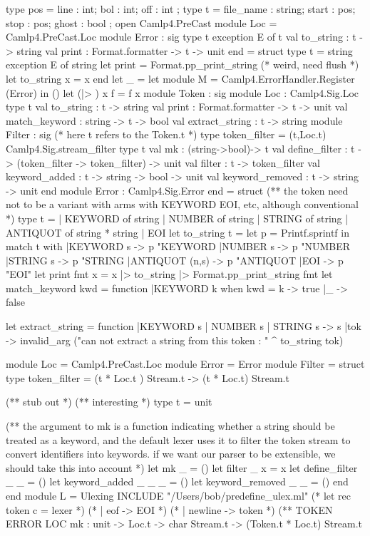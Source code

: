 \begin{enumerate}
\begin{bluecode}
type pos = {
  line : int;
  bol  : int;
  off  : int
};
type t = {
  file_name : string;
  start     : pos;
  stop      : pos;
  ghost     : bool
};
open Camlp4.PreCast 
module Loc = Camlp4.PreCast.Loc 
module Error : sig 
  type t 
  exception E of t 
  val to_string : t -> string 
  val print : Format.formatter -> t -> unit 
end =  struct
  type t = string 
  exception E of string 
  let print = Format.pp_print_string (* weird, need flush *)
  let to_string  x  =  x
end
let _ = 
  let module M = Camlp4.ErrorHandler.Register (Error) in ()
let (|> ) x  f = f x 
module Token : sig 
  module Loc : Camlp4.Sig.Loc 
  type t 
  val to_string : t -> string 
  val print : Format.formatter -> t -> unit 
  val match_keyword : string -> t -> bool 
  val extract_string : t -> string 
  module Filter : sig 
    (* here t refers to the Token.t *)
    type token_filter = (t,Loc.t) Camlp4.Sig.stream_filter 
    type t 
    val mk : (string->bool)-> t 
    val define_filter : t -> (token_filter -> token_filter) -> unit 
    val filter : t -> token_filter 
    val keyword_added : t -> string -> bool -> unit 
    val keyword_removed : t -> string -> unit 
  end
  module Error : Camlp4.Sig.Error  
end = struct 
  (** the token need not to be a variant with arms with KEYWORD
      EOI, etc, although conventional
  *)
  type t = 
    | KEYWORD of string 
    | NUMBER of string 
    | STRING of string 
    | ANTIQUOT of string * string 
    | EOI
  let to_string t = 
    let p = Printf.sprintf in 
    match t with 
      |KEYWORD s -> p "KEYWORD %
      |NUMBER s -> p "NUMBER %
      |STRING s -> p "STRING %
      |ANTIQUOT (n,s) -> p "ANTIQUOT %
      |EOI -> p "EOI"
  let print fmt x = x |> to_string |> Format.pp_print_string fmt 
  let match_keyword kwd = function 
    |KEYWORD k when kwd = k -> true 
    |_ -> false 

  let extract_string = function 
    |KEYWORD s | NUMBER s | STRING s -> s 
    |tok -> invalid_arg ("can not extract a string from this token : "
                         ^ to_string tok)

  module Loc = Camlp4.PreCast.Loc 
  module Error = Error 
  module Filter = struct 
    type token_filter = (t * Loc.t ) Stream.t -> (t * Loc.t) Stream.t 

    (** stub out *)    
    (** interesting *)
    type t = unit 

    (** the argument to mk is a function indicating whether 
        a string should be treated as a keyword, and the default 
        lexer uses it to filter the token stream to convert identifiers
        into keywords. if we want our parser to be extensible, we should
        take this into account 
    *)
    let mk _ = ()
    let filter _ x  = x
    let define_filter _ _ = ()
    let keyword_added _ _ _ = ()
    let keyword_removed _ _ = ()
  end 
end 
module L = Ulexing 
INCLUDE "/Users/bob/predefine_ulex.ml" 
(* let rec token  c = lexer  *)
(*   | eof -> EOI  *)
(*   | newline -> token *)
(** TOKEN ERROR LOC 
    mk : unit -> Loc.t -> char Stream.t -> (Token.t * Loc.t) Stream.t


\end{bluecode}
\end{enumerate}
